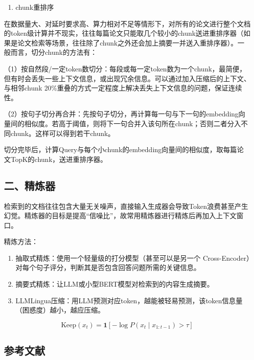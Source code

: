 \begin{enumerate}
\def\labelenumi{\arabic{enumi}.}
\setcounter{enumi}{1}
\tightlist
\item
  chunk重排序
\end{enumerate}

在数据量大、对延时要求高、算力相对不足等情形下，对所有的论文进行整个文档的token级计算并不现实，往往每篇论文只能取几个较小的chunk送进重排序器（如果是论文检索等场景，往往除了chunk之外还会加上摘要一并送入重排序器）。一般而言，切分chunk的方法有：

（1）按自然段/一定token数切分：每段或每一定token数为一个chunk，最简便，但有时会丢失一些上下文信息，或出现冗余信息。可以通过加入压缩后的上下文、与相邻chunk 20\%重叠的方式一定程度上解决丢失上下文信息的问题，保证连续性。

（2）按句子切分再合并：先按句子切分，再计算每一句与下一句的embedding向量间的相似度。若高于阈值，则将下一句合并入该句所在chunk；否则二者分入不同chunk。这样可以得到若干chunk。

切分完毕后，计算Query与每个小chunk的embedding向量间的相似度，取每篇论文TopK的chunk，送进重排序器。

\hypertarget{ux4e8cux7cbeux70bcux5668}{%
\subsection{二、精炼器}\label{ux4e8cux7cbeux70bcux5668}}

检索到的文档往往包含大量无关噪声，直接输入生成器会导致Token浪费甚至产生幻觉。精炼器的目标是提高``信噪比''，故常用精炼器进行精炼后再加入上下文窗口。

精炼方法：

\begin{enumerate}
\def\labelenumi{\arabic{enumi}.}
\item
  抽取式精炼：使用一个轻量级的打分模型（甚至可以是另一个 Cross-Encoder）对每个句子评分，判断其是否包含回答问题所需的关键信息。
\item
  摘要式精炼：让LLM或小型BERT模型对检索到的内容生成摘要。
\item
  LLMLingua压缩：用LLM预测对应token，越能被轻易预测，该token信息量（困惑度）越小，越应压缩。
\end{enumerate}

\[
\mathrm{Keep}(x_t)=\mathbf{1}\!\left[-\log P\!\left(x_t \mid x_{1:t-1}\right)>\tau\right]
\]

\hypertarget{ux53c2ux8003ux6587ux732e-132}{%
\subsection{参考文献}\label{ux53c2ux8003ux6587ux732e-132}}

